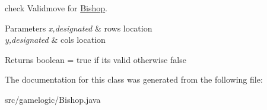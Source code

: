 check Validmove for \mbox{\hyperlink{classgamelogic_1_1_bishop}{Bishop}}. 
\begin{DoxyParams}{Parameters}
{\em x,designated} & row\textquotesingle{}s location \\
\hline
{\em y,designated} & col\textquotesingle{}s location \\
\hline
\end{DoxyParams}
\begin{DoxyReturn}{Returns}
boolean = true if it\textquotesingle{}s valid otherwise false 
\end{DoxyReturn}


The documentation for this class was generated from the following file\+:\begin{DoxyCompactItemize}
\item 
src/gamelogic/Bishop.\+java\end{DoxyCompactItemize}
